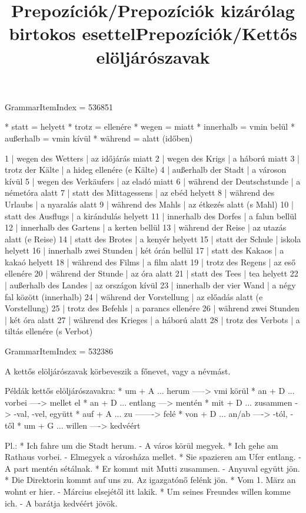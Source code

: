 \title{Prepozíciók/Prepozíciók kizárólag birtokos esettel}

GrammarItemIndex = 536851

\begin{desc}
* statt = helyett
* trotz = ellenére
* wegen = miatt
* innerhalb = vmin belül
* außerhalb = vmin kívül
* während = alatt (időben)
\end{desc}

\begin{exmp}
1 | wegen des Wetters | az időjárás miatt
2 | wegen des Krigs | a háború miatt
3 | trotz der Kälte | a hideg ellenére (e Kälte)
4 | außerhalb der Stadt | a városon kívül
5 | wegen des Verkäufers | az eladó miatt
6 | während der Deutschstunde | a németóra alatt
7 | statt des Mittagessens | az ebéd helyett
8 | während des Urlaubs | a nyaralás alatt
9 | während des Mahls | az étkezés alatt (s Mahl)
10 | statt des Ausflugs | a kirándulás helyett
11 | innerhalb des Dorfes | a falun bellül
12 | innerhalb des Gartens | a kerten bellül
13 | während der Reise | az utazás alatt (e Reise)
14 | statt des Brotes | a kenyér helyett
15 | statt der Schule | iskola helyett
16 | innerhalb zwei Stunden | két órán bellül
17 | statt des Kakaos | a kakaó helyett
18 | während des Films | a film alatt
19 | trotz des Regens | az eső ellenére
20 | während der Stunde | az óra alatt
21 | statt des Tees | tea helyett
22 | außerhalb des Landes | az országon kívül
23 | innerhalb der vier Wand | a négy fal között (innerhalb)
24 | während der Vorstellung | az előadás alatt (e Vorstellung)
25 | trotz des Befehls | a parancs ellenére
26 | während zwei Stunden | két óra alatt
27 | während des Krieges | a háború alatt
28 | trotz des Verbots | a tiltás ellenére (s Verbot)
\end{exmp}

\title{Prepozíciók/Kettős elöljárószavak}

GrammarItemIndex = 532386

\begin{desc}
A kettős elöljárószavak körbeveszik a főnevet, vagy a névmást.

Példák kettős elöljárószavakra:
* um + A ... herum -----> vmi körül
* an + D ... vorbei ----> mellet el
* an + D ... entlang ---> mentén
* mit + D ... zusammen -> -val, -vel, együtt
* auf + A ... zu -------> felé
* von + D ... an/ab ----> -tól, -től
* um + G ... willen ----> kedvéért

Pl.: * Ich fahre um die Stadt herum. - A város körül megyek.
* Ich gehe am Rathaus vorbei. - Elmegyek a városháza mellet.
* Sie spazieren am Ufer entlang. - A part mentén sétálnak.
* Er kommt mit Mutti zusammen. - Anyuval együtt jön.
* Die Direktorin kommt auf uns zu. Az igazgatónő felénk jön.
* Vom 1. März an wohnt er hier. - Március elsejétől itt lakik.
* Um seines Freundes willen komme ich. - A barátja kedvéért jövök.
\end{desc}

